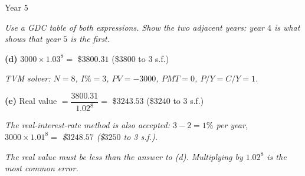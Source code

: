 \documentclass[12pt, twoside]{article}
\begin{document}
\begin{enumerate}[itemsep=0.3cm]
Year $5$

\emph{Use a GDC table of both expressions. Show the two adjacent years:
year $4$ is what shows that year $5$ is the \emph{first}.}

\medskip

\textbf{(d)} $3000 \times 1.03^{8} = $ \$$3800.31$ \quad (\$$3800$ to
3 s.f.)

\emph{TVM solver: $N = 8$, $I\% = 3$, $PV = -3000$, $PMT = 0$,
$P/Y = C/Y = 1$.}

\medskip

\textbf{(e)} Real value $= \dfrac{3800.31}{1.02^{8}} = $ \$$3243.53$
\quad (\$$3240$ to 3 s.f.)

\emph{The real-interest-rate method is also accepted: $3 - 2 = 1\%$ per
year, $3000 \times 1.01^{8} = $ \$$3248.57$ (\$$3250$ to 3 s.f.).}

\emph{The real value must be less than the answer to (d). Multiplying
by $1.02^{8}$ is the most common error.}

\end{enumerate}
\end{document}
